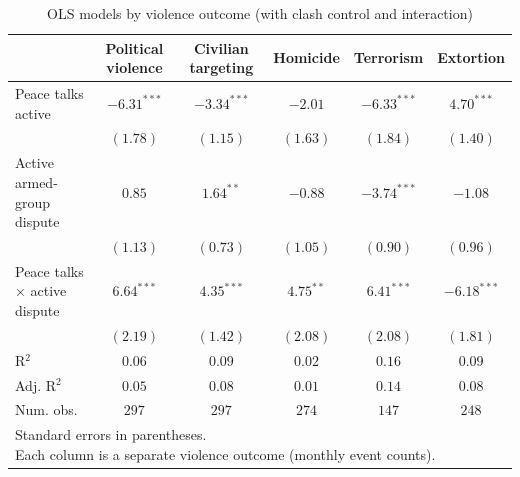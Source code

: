 
\begin{table}
\caption{OLS models by violence outcome (with clash control and interaction)}
\begin{center}
\begin{tabular}{l c c c c c}
\toprule
 & Political violence & Civilian targeting & Homicide & Terrorism & Extortion \\
\midrule
Peace talks active           & $-6.31^{***}$ & $-3.34^{***}$ & $-2.01$     & $-6.33^{***}$ & $4.70^{***}$  \\
                             & $(1.78)$      & $(1.15)$      & $(1.63)$    & $(1.84)$      & $(1.40)$      \\
Active armed-group dispute   & $0.85$        & $1.64^{**}$   & $-0.88$     & $-3.74^{***}$ & $-1.08$       \\
                             & $(1.13)$      & $(0.73)$      & $(1.05)$    & $(0.90)$      & $(0.96)$      \\
Peace talks × active dispute & $6.64^{***}$  & $4.35^{***}$  & $4.75^{**}$ & $6.41^{***}$  & $-6.18^{***}$ \\
                             & $(2.19)$      & $(1.42)$      & $(2.08)$    & $(2.08)$      & $(1.81)$      \\
\midrule
R$^2$                        & $0.06$        & $0.09$        & $0.02$      & $0.16$        & $0.09$        \\
Adj. R$^2$                   & $0.05$        & $0.08$        & $0.01$      & $0.14$        & $0.08$        \\
Num. obs.                    & $297$         & $297$         & $274$       & $147$         & $248$         \\
\bottomrule
\multicolumn{6}{l}{\scriptsize{\parbox{\linewidth}{Standard errors in parentheses.\\[0.35em] Each column is a separate violence outcome (monthly event counts).}}}
\end{tabular}
\label{tab:violence_ols}
\end{center}
\end{table}
